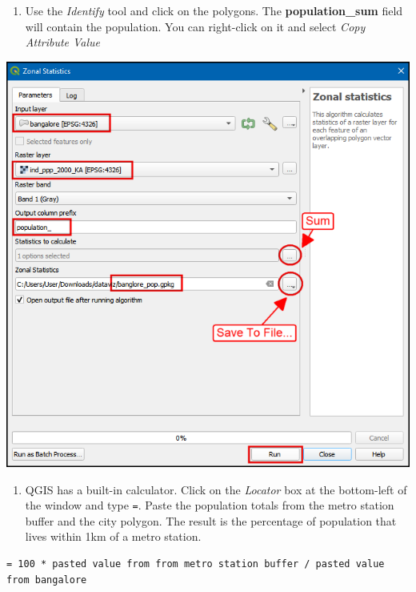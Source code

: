 \documentclass[
  12pt,
  a4paper]{article}
\providecommand{\tightlist}{%
  \setlength{\itemsep}{0pt}\setlength{\parskip}{0pt}}
\begin{document}
\begin{enumerate}
\def\labelenumi{\arabic{enumi}.}
\setcounter{enumi}{16}
\tightlist
\item
  Use the \emph{Identify} tool and click on the polygons. The
  \textbf{population\_sum} field will contain the population. You can
  right-click on it and select \emph{Copy Attribute Value}
\end{enumerate}

\begin{center}\includegraphics[width=0.75\linewidth]{images/spatial_data_viz/pop17} \end{center}

\begin{enumerate}
\def\labelenumi{\arabic{enumi}.}
\setcounter{enumi}{17}
\tightlist
\item
  QGIS has a built-in calculator. Click on the \emph{Locator} box at the
  bottom-left of the window and type \texttt{=}. Paste the population
  totals from the metro station buffer and the city polygon. The result
  is the percentage of population that lives within 1km of a metro
  station.
\end{enumerate}

\begin{verbatim}
= 100 * pasted value from from metro station buffer / pasted value from bangalore 
\end{verbatim}
\end{document}
